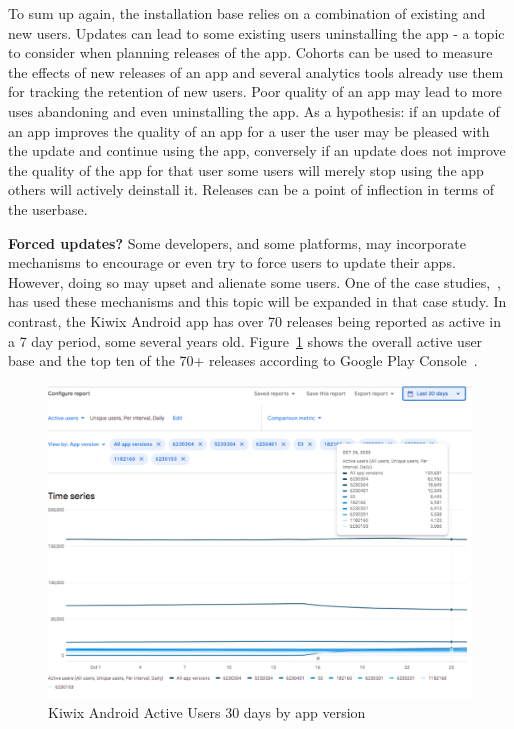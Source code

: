 To sum up again, the installation base relies on a combination of existing and new users. Updates can lead to some existing users uninstalling the app - a topic to consider when planning releases of the app. Cohorts can be used to measure the effects of new releases of an app and several analytics tools already use them for tracking the retention of new users. Poor quality of an app may lead to more uses abandoning and even uninstalling the app. As a hypothesis: if an update of an app improves the quality of an app for a user the user may be pleased with the update and continue using the app, conversely if an update does not improve the quality of the app for that user some users will merely stop using the app others will actively deinstall it. Releases can be a point of inflection in terms of the userbase.

\textbf{Forced updates?} Some developers, and some platforms, may incorporate mechanisms to encourage or even try to force users to update their apps. However, doing so may upset and alienate some users. One of the case studies,~\href{study-greentech-apps}{\emph{}}, has used these mechanisms and this topic will be expanded in that case study. In contrast, the Kiwix Android app has over 70 releases being reported as active in a 7 day period, some several years old. Figure~\ref{fig:kiwix-30d-active-users} shows the overall active user base and the top ten of the 70+ releases according to Google Play Console~.

\begin{figure}
    \includegraphics[width=\linewidth]{images/android-vitals-screenshots/kiwix/kiwix-ActiveUsers-30-days-2020-10-29.pdf}
    \caption{Kiwix Android Active Users 30 days by app version}
    \label{fig:kiwix-30d-active-users}
\end{figure}


